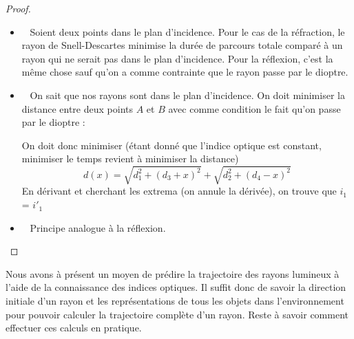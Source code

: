 \documentclass{classe}
\newcommand{\point}[3]{\draw (#1 -.1, #2 -.1) -- (#1 + .1, #2 + .1);
\draw (#1 +.1, #2 -.1) -- (#1 - .1, #2 + .1);
\draw (#1, #2) node[below right]{#3};}
\begin{document}
\begin{proof}
\begin{itemize}
	\item \color{vulm}{Plan d'incidence :}\ \color{black} Soient deux points dans le plan d'incidence. Pour le cas de la réfraction, le rayon de Snell-Descartes minimise la durée de parcours totale comparé à un rayon qui ne serait pas dans le plan d'incidence. Pour la réflexion, c'est la même chose sauf qu'on a comme contrainte que le rayon passe par le dioptre.
	\item \color{vulm}{Réflexion :}\ \color{black} On sait que nos rayons sont dans le plan d'incidence. On doit minimiser la distance entre deux points $A$ et $B$ avec comme condition le fait qu'on passe par le dioptre :
	\begin{figure}[H]
	\centering
	\end{figure}
	\noindent On doit donc minimiser (étant donné que l'indice optique est constant, minimiser le temps revient à minimiser la distance)
	\begin{equation*}
	d(x) = \sqrt{d_1^2+(d_3+x)^2} + \sqrt{d_2^2+(d_4-x)^2}
	\end{equation*}
	En dérivant et cherchant les extrema (on annule la dérivée), on trouve que $i_1$ = $i'_1$
	\item \color{vulm}{Réfraction :}\ \color{black} Principe analogue à la réflexion.

\end{itemize}
\end{proof}
Nous avons à présent un moyen de prédire la trajectoire des rayons lumineux à l'aide de la connaissance des indices optiques.
Il suffit donc de savoir la direction initiale d'un rayon et les représentations de tous les objets dans l'environnement pour pouvoir calculer la trajectoire complète d'un rayon.
Reste à savoir comment effectuer ces calculs en pratique.
\end{document}
